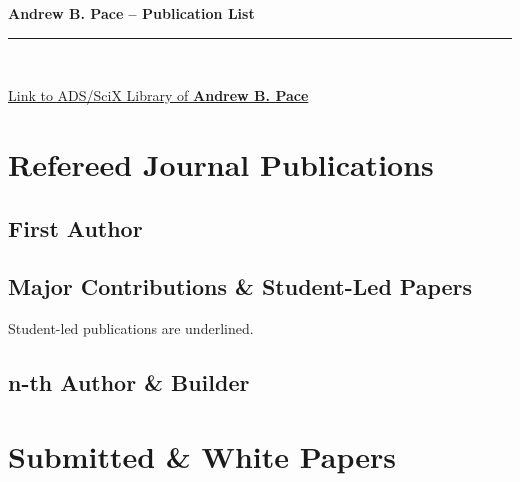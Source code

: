 \documentclass[14pt]{article}
\begin{document}


\begin{center}
\indent \textbf{\LARGE Andrew B. Pace -- Publication List} \\
\indent \rule{17cm}{0.4pt}\\
\end{center}


\noindent \href{https://scixplorer.org/search?p=1&q=docs%28library%2FhJ77Di5nQ0qwHYNpG0yRpA%29&sort=date+desc&d=astrophysics}{Link to ADS/SciX Library of {\bf Andrew B. Pace}} 



\par 


\section*{Refereed Journal Publications}

\subsection*{First Author}

\begin{etaremune}

\end{etaremune}


\subsection*{Major Contributions \& Student-Led Papers}
Student-led publications are underlined.


\begin{etaremune}

\end{etaremune}


\subsection*{n-th Author \& Builder}


\begin{etaremune}

\end{etaremune}

\section*{Submitted \& White Papers}


\begin{etaremune}

\end{etaremune}
\end{document}
